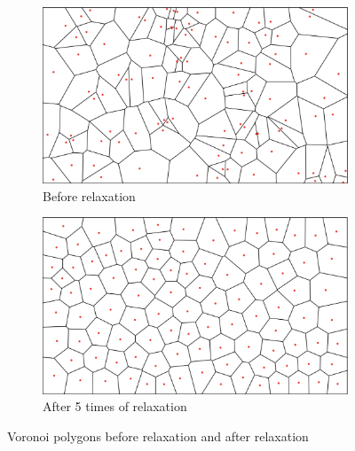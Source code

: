 \begin{figure}
\centering
  \begin{subfigure}{.5\textwidth}
    \centering
    \includegraphics[width=.99\textwidth]{section04/assets/Map-voronoi.png}
    \caption{Before relaxation}
    \label{fig:Voronoi polygons}
  \end{subfigure}%
  \begin{subfigure}{.5\textwidth}
    \centering
    \includegraphics[width=.99\textwidth]{section04/assets/Map-voronoi-relaxation.png}
    \caption{After 5 times of relaxation}
    \label{fig:Voronoi relaxed polygons}
  \end{subfigure}
  \caption{Voronoi polygons before relaxation and after relaxation}
  \label{fig:Voronoi polygons before relaxation and after relaxation}
\end{figure}

